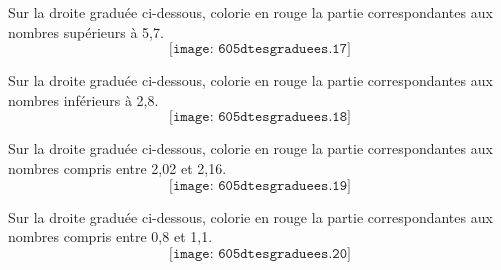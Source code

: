 \begin{myenumerate}
  \item Sur la droite graduée ci-dessous, colorie en rouge la partie correspondantes aux nombres supérieurs à 5,7.
\[\texttt{[image: 605dtesgraduees.17]}\]
  \item Sur la droite graduée ci-dessous, colorie en rouge la partie correspondantes aux nombres inférieurs à 2,8.
\[\texttt{[image: 605dtesgraduees.18]}\]
  \item Sur la droite graduée ci-dessous, colorie en rouge la partie correspondantes aux nombres compris entre 2,02 et 2,16.
\[\texttt{[image: 605dtesgraduees.19]}\]
  \item Sur la droite graduée ci-dessous, colorie en rouge la partie correspondantes aux nombres compris entre 0,8 et 1,1.
\[\texttt{[image: 605dtesgraduees.20]}\]
\end{myenumerate}